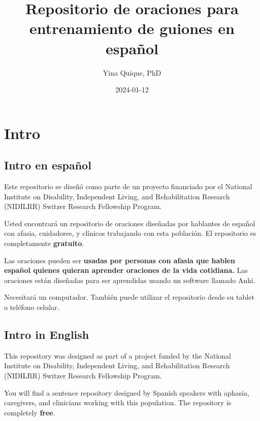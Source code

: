 \documentclass[
]{book}
\title{Repositorio de oraciones para entrenamiento de guiones en español}
\author{Yina Quique, PhD}
\date{2024-01-12}
\begin{document}
\maketitle

{
\setcounter{tocdepth}{1}
\tableofcontents
}
\hypertarget{intro}{%
\chapter*{Intro}\label{intro}}

\hypertarget{intro-en-espauxf1ol}{%
\section*{\texorpdfstring{Intro en \textbf{español}}{Intro en español}}\label{intro-en-espauxf1ol}}

Este repositorio se diseñó como parte de un proyecto financiado por el National Institute on Disability, Independent Living, and Rehabilitation Research (NIDILRR) Switzer Research Fellowship Program.

Usted encontrará un repositorio de oraciones diseñadas por hablantes de español con afasia, cuidadores, y clínicos trabajando con esta población. El repositorio es completamente \textbf{gratuito}.

Las oraciones pueden ser \textbf{usadas por personas con afasia que hablen español quienes quieran aprender oraciones de la vida cotidiana.} Las oraciones están diseñadas para ser aprendidas usando un software llamado Anki.

Necesitará un computador. También puede utilizar el repositorio desde su tablet o teléfono celular.

\hypertarget{intro-in-english}{%
\section*{\texorpdfstring{Intro in \textbf{English}}{Intro in English}}\label{intro-in-english}}

This repository was designed as part of a project funded by the National Institute on Disability, Independent Living, and Rehabilitation Research (NIDILRR) Switzer Research Fellowship Program.

You will find a sentence repository designed by Spanish speakers with aphasia, caregivers, and clinicians working with this population. The repository is completely \textbf{free}.
\end{document}

